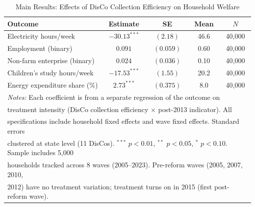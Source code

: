 \begin{table}[h!]
\centering
\caption{Main Results: Effects of DisCo Collection Efficiency on Household Welfare}
\label{tab:main}
\small
\begin{tabular}{lcccc}
\hline
Outcome & Estimate & SE & Mean & $N$ \\
\hline
Electricity hours/week & $-30.13^{***}$ & $(2.18)$ & 46.6 & 40,000 \\
Employment (binary) & $0.091$ & $(0.059)$ & 0.60 & 40,000 \\
Non-farm enterprise (binary) & $0.024$ & $(0.036)$ & 0.10 & 40,000 \\
Children's study hours/week & $-17.53^{***}$ & $(1.55)$ & 20.2 & 40,000 \\
Energy expenditure share (\%) & $2.73^{***}$ & $(0.375)$ & 8.0 & 40,000 \\
\hline
\multicolumn{5}{l}{\textit{Notes:} Each coefficient is from a separate regression of the outcome on}\\
\multicolumn{5}{l}{treatment intensity (DisCo collection efficiency $\times$ post-2013 indicator). All}\\
\multicolumn{5}{l}{specifications include household fixed effects and wave fixed effects. Standard errors}\\
\multicolumn{5}{l}{clustered at state level (11 DisCos). $^{***}$ $p < 0.01$, $^{**}$ $p < 0.05$, $^*$ $p < 0.10$. Sample includes 5,000}\\
\multicolumn{5}{l}{households tracked across 8 waves (2005--2023). Pre-reform waves (2005, 2007, 2010,}\\
\multicolumn{5}{l}{2012) have no treatment variation; treatment turns on in 2015 (first post-reform wave).}\\
\end{tabular}
\end{table}
